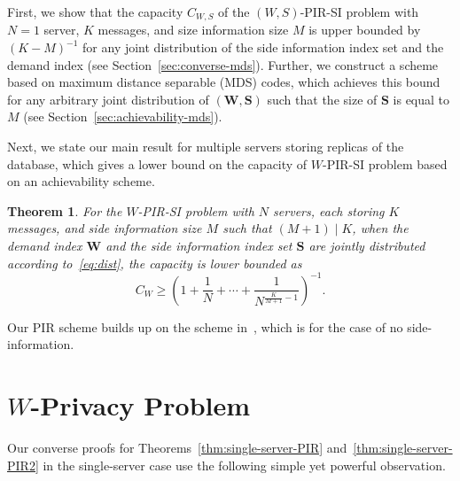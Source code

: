 \documentclass[letterpaper, 10 pt, conference]{ieeeconf}
\newtheorem{theorem}{Theorem}
\newcommand{\Q}[2]{Q^{[#1, #2]}} %
\newcommand{\A}[2]{A^{[#1,#2]}} %
\begin{document}
First, we  show that the capacity $C_{W,S}$ of the $(W,S)$-PIR-SI problem with $N = 1$ server, $K$ messages, and size information size $M$ is upper bounded by $(K-M)^{-1}$ for any  joint distribution of the side information index set and the demand index (see %
Section~\ref{sec:converse-mds}). Further, we  construct a  scheme based on maximum distance separable (MDS) codes, which achieves this bound for any arbitrary joint distribution of $(\mathbf{W},\mathbf{S})$ such that the size of $\mathbf{S}$ is equal to $M$ (see Section~\ref{sec:achievability-mds}).  

Next, we state our main result for multiple servers storing replicas of the database, which gives a lower bound on the capacity of $W$-PIR-SI problem based on an achievability scheme.
\begin{theorem}
\label{thm:multi-server-PIR}
For the $W$-PIR-SI problem with $N$ servers, each storing $K$ messages, and side information size $M$ such that $(M+1)\mid K$, when the demand index $\mathbf{W}$ and the side information index set $\mathbf{S}$ are jointly distributed according to~\eqref{eq:dist}, %
the capacity is lower bounded as
\begin{equation}
\label{eq:capacity-partition}
C_{W} \geq \left(1 + \frac{1}{N} + \cdots + \frac{1}{N^{\frac{K}{M+1}-1}}\right)^{-1}.
\end{equation}
\end{theorem}
Our PIR scheme %
builds up on the scheme in~\cite{sun2016capacitynoncol}, which is for the case of no side-information.

\section{$W$-Privacy Problem}
\label{sec:IEEEproofs}


Our converse proofs for Theorems~\ref{thm:single-server-PIR} and~\ref{thm:single-server-PIR2} in the single-server case use the following simple yet powerful observation. %
\end{document}
